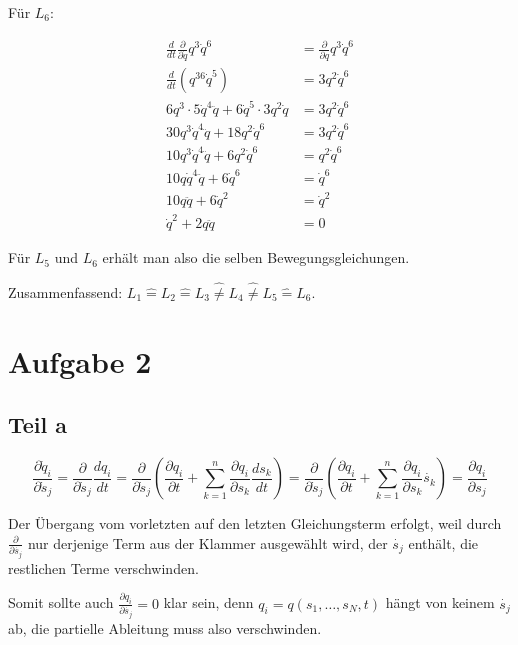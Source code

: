\documentclass[a4paper,german,12pt,smallheadings]{scrartcl}
\begin{document}
Für $L_6$:

\begin{align*}
  \frac{d}{dt} \frac{\partial}{\partial \dot{q}} q^3\dot{q}^6 &= \frac{\partial}{\partial q} q^3\dot{q}^6 \\
  \frac{d}{dt} (q^36\dot{q}^5) &= 3q^2\dot{q}^6 \\
  6q^3 \cdot 5\dot{q}^4\ddot{q} + 6\dot{q}^5\cdot3q^2\dot{q} &= 3q^2\dot{q}^6 \\
  30q^3\dot{q}^4\ddot{q} + 18q^2\dot{q}^6 &= 3q^2\dot{q}^6 \\
  10q^3\dot{q}^4\ddot{q} + 6q^2\dot{q}^6 &= q^2\dot{q}^6 \\
  10q\dot{q}^4\ddot{q} + 6\dot{q}^6 &= \dot{q}^6 \\
  10q\ddot{q} + 6\dot{q}^2 &= \dot{q}^2 \\
  \dot{q}^2 + 2q\ddot{q} &= 0
\end{align*}

Für $L_5$ und $L_6$ erhält man also die selben Bewegungsgleichungen.

Zusammenfassend: $L_1 \widehat{=} L_2 \widehat{=} L_3 \widehat{\neq} L_4 \widehat{\neq} L_5 \widehat{=} L_6$.

\section*{Aufgabe 2}
\subsection*{Teil a}

\begin{equation*}
  \frac{\partial \dot{q}_i}{\partial \dot{s}_j} =
  \frac{\partial}{\partial \dot{s}_j} \frac{dq_i}{dt} =
  \frac{\partial}{\partial \dot{s}_j} \left(\frac{\partial q_i}{\partial t} + \sum_{k=1}^n \frac{\partial q_i}{\partial s_k} \frac{ds_k}{dt}\right) =
  \frac{\partial}{\partial \dot{s}_j} \left(\frac{\partial q_i}{\partial t} + \sum_{k=1}^n \frac{\partial q_i}{\partial s_k} \dot{s_k}\right) =
  \frac{\partial q_i}{\partial s_j}
\end{equation*}

Der Übergang vom vorletzten auf den letzten Gleichungsterm erfolgt, weil durch
$\frac{\partial}{\partial \dot{s_j}}$ nur derjenige Term aus der Klammer
ausgewählt wird, der $\dot{s_j}$ enthält, die restlichen Terme verschwinden.

Somit sollte auch $\frac{\partial q_i}{\partial \dot{s_j}} = 0$ klar sein, denn
$q_i = q(s_1, \dots, s_N, t)$ hängt von keinem $\dot{s_j}$ ab, die partielle
Ableitung muss also verschwinden.
\end{document}
